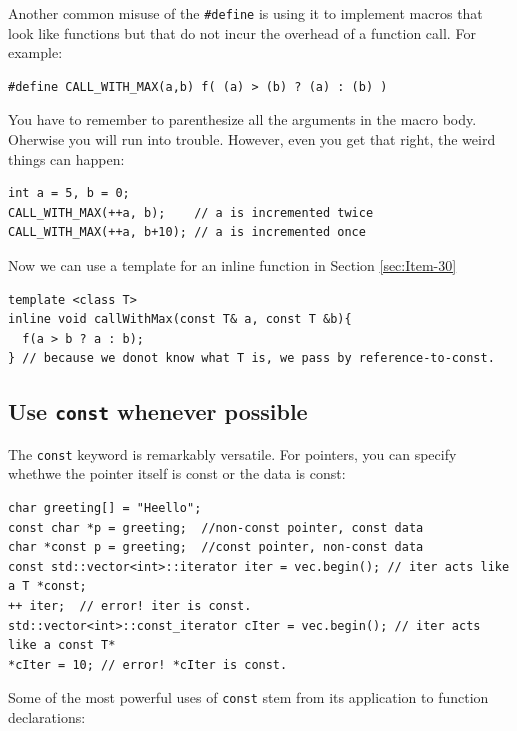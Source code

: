 Another common misuse of the \texttt{\#define} is using it to
implement macros that look like functions but that do not incur the
overhead of a function call. For example:
\begin{verbatim}
#define CALL_WITH_MAX(a,b) f( (a) > (b) ? (a) : (b) )
\end{verbatim}

You have to remember to parenthesize all the arguments in the macro
body. Oherwise you will run into trouble. However, even you get that
right, the weird things can happen:
\begin{verbatim}
int a = 5, b = 0;
CALL_WITH_MAX(++a, b);    // a is incremented twice
CALL_WITH_MAX(++a, b+10); // a is incremented once
\end{verbatim}

Now we can use a template for an inline function in Section \ref{sec:Item-30}
\begin{verbatim}
template <class T>
inline void callWithMax(const T& a, const T &b){
  f(a > b ? a : b);
} // because we donot know what T is, we pass by reference-to-const.
\end{verbatim}

\subsection{Use \texttt{const} whenever possible}
\label{sec:Item-3}
The \texttt{const} keyword is remarkably versatile. For pointers, you
can specify whethwe the pointer itself is const or the data is const:
\begin{verbatim}
char greeting[] = "Heello";
const char *p = greeting;  //non-const pointer, const data
char *const p = greeting;  //const pointer, non-const data
const std::vector<int>::iterator iter = vec.begin(); // iter acts like a T *const;
++ iter;  // error! iter is const.
std::vector<int>::const_iterator cIter = vec.begin(); // iter acts like a const T*
*cIter = 10; // error! *cIter is const.
\end{verbatim}

Some of the most powerful uses of \texttt{const} stem from its
application to function declarations:

